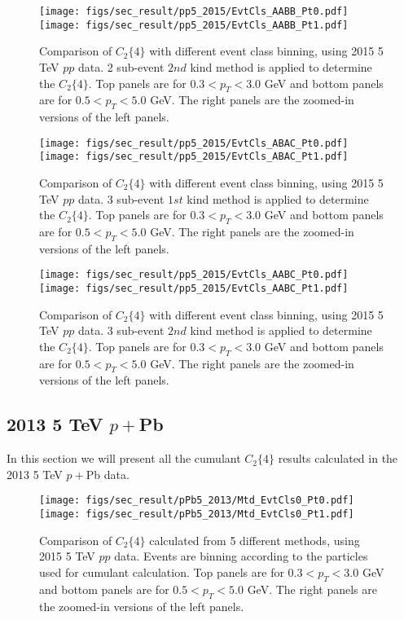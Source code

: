 \begin{figure}[H]
\centering
\texttt{[image: figs/sec\_result/pp5\_2015/EvtCls\_AABB\_Pt0.pdf]}
\texttt{[image: figs/sec\_result/pp5\_2015/EvtCls\_AABB\_Pt1.pdf]}
\caption{Comparison of $C_{2}\{4\}$ with different event class binning, using 2015 5 TeV $pp$ data. 2 sub-event $2nd$ kind method is applied to determine the $C_{2}\{4\}$. Top panels are for $0.3<p_{T}<3.0$ GeV and bottom panels are for $0.5<p_{T}<5.0$ GeV. The right panels are the zoomed-in versions of the left panels.}
\label{fig:result_pp5_2015_EvtCls_AABB}
\end{figure}

\begin{figure}[H]
\centering
\texttt{[image: figs/sec\_result/pp5\_2015/EvtCls\_ABAC\_Pt0.pdf]}
\texttt{[image: figs/sec\_result/pp5\_2015/EvtCls\_ABAC\_Pt1.pdf]}
\caption{Comparison of $C_{2}\{4\}$ with different event class binning, using 2015 5 TeV $pp$ data. 3 sub-event $1st$ kind method is applied to determine the $C_{2}\{4\}$. Top panels are for $0.3<p_{T}<3.0$ GeV and bottom panels are for $0.5<p_{T}<5.0$ GeV. The right panels are the zoomed-in versions of the left panels.}
\label{fig:result_pp5_2015_EvtCls_ABAC}
\end{figure}

\begin{figure}[H]
\centering
\texttt{[image: figs/sec\_result/pp5\_2015/EvtCls\_AABC\_Pt0.pdf]}
\texttt{[image: figs/sec\_result/pp5\_2015/EvtCls\_AABC\_Pt1.pdf]}
\caption{Comparison of $C_{2}\{4\}$ with different event class binning, using 2015 5 TeV $pp$ data. 3 sub-event $2nd$ kind method is applied to determine the $C_{2}\{4\}$. Top panels are for $0.3<p_{T}<3.0$ GeV and bottom panels are for $0.5<p_{T}<5.0$ GeV. The right panels are the zoomed-in versions of the left panels.}
\label{fig:result_pp5_2015_EvtCls_AABC}
\end{figure}



\subsection{2013 5 TeV $p+$Pb}
In this section we will present all the cumulant $C_{2}\{4\}$ results calculated in the 2013 5 TeV $p+$Pb data.

\begin{figure}[H]
\centering
\texttt{[image: figs/sec\_result/pPb5\_2013/Mtd\_EvtCls0\_Pt0.pdf]}
\texttt{[image: figs/sec\_result/pPb5\_2013/Mtd\_EvtCls0\_Pt1.pdf]}
\caption{Comparison of $C_{2}\{4\}$ calculated from 5 different methods, using 2015 5 TeV $pp$ data. Events are binning according to the particles used for cumulant calculation. Top panels are for $0.3<p_{T}<3.0$ GeV and bottom panels are for $0.5<p_{T}<5.0$ GeV. The right panels are the zoomed-in versions of the left panels.}
\label{fig:result_pPb5_2013_Mtd_EvtCls0}
\end{figure}

